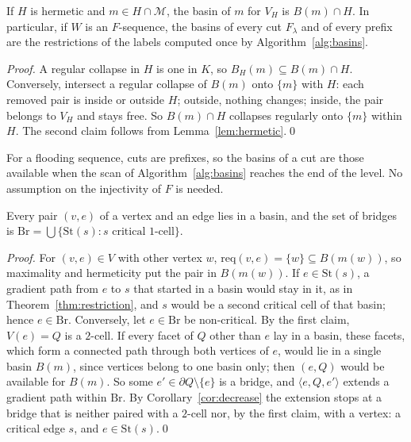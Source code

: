 \documentclass[runningheads]{llncs}
\newcommand{\St}{\mathrm{St}}
\newcommand{\req}{\mathrm{req}}
\newcommand{\Br}{\mathrm{Br}}
\begin{document}
\begin{theorem}\label{thm:basin-restriction}
If $H$ is hermetic and $m\in H\cap\mathcal{M}$, the basin of $m$ for $V_H$
is $B(m)\cap H$. In particular, if $W$ is an $F$-sequence, the basins of
every cut $F_\lambda$ and of every prefix are the restrictions of the labels
computed once by Algorithm~\ref{alg:basins}.
\end{theorem}

\begin{proof}
A regular collapse in $H$ is one in $K$, so $B_H(m)\subseteq B(m)\cap H$.
Conversely, intersect a regular collapse of $B(m)$ onto $\{m\}$ with $H$:
each removed pair is inside or outside $H$; outside, nothing changes;
inside, the pair belongs to $V_H$ and stays free. So $B(m)\cap H$
collapses regularly onto $\{m\}$ within $H$. The second claim follows from
Lemma~\ref{lem:hermetic}.\qed
\end{proof}

For a flooding sequence, cuts are prefixes, so the basins of a cut are
those available when the scan of Algorithm~\ref{alg:basins} reaches the
end of the level. No assumption on the injectivity of $F$ is needed.

\begin{theorem}[Bridges]\label{thm:bridges}
Every pair $(v,e)$ of a vertex and an edge lies in a basin, and the set of
bridges is
$\Br=\bigcup\{\St(s): s\text{ critical }1\text{-cell}\}$.
\end{theorem}

\begin{proof}
For $(v,e)\in V$ with other vertex $w$, $\req(v,e)=\{w\}\subseteq B(m(w))$,
so maximality and hermeticity put the pair in $B(m(w))$. If
$e\in\St(s)$, a gradient path from $e$ to $s$ that started in a basin would
stay in it, as in Theorem~\ref{thm:restriction}, and $s$ would be a second
critical cell of that basin; hence $e\in\Br$. Conversely, let $e\in\Br$ be
non-critical. By the first claim, $V(e)=Q$ is a $2$-cell. If every facet of
$Q$ other than $e$ lay in a basin, these facets, which form a connected
path through both vertices of $e$, would lie in a single basin $B(m)$,
since vertices belong to one basin only; then $(e,Q)$ would be available
for $B(m)$. So some $e'\in\partial Q\setminus\{e\}$ is a bridge, and
$\langle e,Q,e'\rangle$ extends a gradient path within $\Br$. By
Corollary~\ref{cor:decrease} the extension stops at a bridge that is
neither paired with a $2$-cell nor, by the first claim, with a vertex: a
critical edge $s$, and $e\in\St(s)$.\qed
\end{proof}
\end{document}
